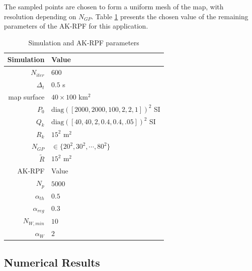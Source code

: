 \documentclass[conference]{IEEEtran}
\begin{document}
The sampled points are chosen to form a uniform mesh of the map, with resolution depending on $N_{GP}$. Table \ref{tab:parameters} presents the chosen value of the remaining parameters of the AK-RPF for this application.

\begin{table}[ht]
\renewcommand{\arraystretch}{1.3}
\centering \caption{Simulation and AK-RPF parameters} \label{tab:parameters}
\begin{tabular}{rl} \hline
Simulation & Value \\ \hline
$N_{iter}$ & $600$ \\
$\Delta_t$ & $0.5$ s \\
map surface & $40 \times 100$ km$^2$ \\
$P_0$ & $\text{diag}([2000, 2000, 100, 2, 2, 1])^2$ SI \footnotemark \\
$Q_k$ & $\text{diag}([40 ,40 ,2 ,0.4 ,0.4, .05])^2$ SI \\
$R_k$ & $15^2$ m$^2$ \\
$N_{GP}$ & $\in \{20^2, 30^2, \cdots, 80^2\}$ \\
$\tilde R$ & $15^2$ m$^2$ \\ \hhline{==}
AK-RPF & Value \\ \hline
$N_p$ & $5000$ \\
$\alpha_{th}$ & $0.5$ \\
$\alpha_{reg}$ & $0.3$ \\
$N_{W,min}$ & $10$ \\
$\alpha_W$ & $2$ \\
\hline
\end{tabular}
\end{table}

\subsection{Numerical Results}
\end{document}
